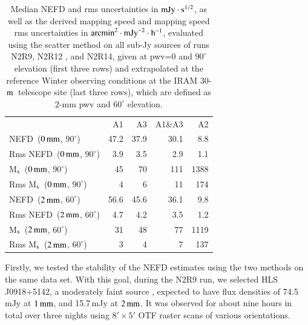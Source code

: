 \documentclass[traditionalabstract]{aa}
\newcommand{\hls}{HLS\,J0918+5142}
\newcommand{\trentemetre}{30-$\rm{m}$}
\begin{document}
{\begin{table}[!thbp]
  \begin{center}
    \caption[NEFD estimates on all sub-Jy sources]{Median NEFD and rms
      uncertainties in $\rm{mJy}\cdot s^{1/2}$, as well as the derived mapping
      speed and mapping speed rms uncertainties in
    $\rm{arcmin}^2\cdot \rm{mJy}^{-2}\cdot\rm{h}^{-1}$, evaluated
using the scatter method on all sub-Jy sources of runs N2R9, N2R12
,      and N2R14, given at pwv=0 and $90^{\circ}$ elevation (first three rows) and extrapolated at the
      reference Winter observing conditions at the IRAM
      \trentemetre\ telescope site (last three rows), which are defined
      as $2$-mm pwv and $60^{\circ}$ elevation.}
    \label{tab:nefd_astro}
    \begin{tabular}{lrrrr}
      \hline\hline
      \noalign{\smallskip}
                    & A1      &   A3    &   A1\&A3 &    A2 \\
      \noalign{\smallskip}
      \hline
      \noalign{\smallskip}
      NEFD\, \small{($0\,\rm{mm}$, $90^{\circ}$)}             & 47.2    & 37.9    &    30.1  &    8.8   \\
      Rms NEFD\, \small{($0\,\rm{mm}$, $90^{\circ}$)}         &  3.9    &  3.5    &     2.9  &    1.1   \\
      M$_{\rm{s}}$\, \small{($0\,\rm{mm}$, $90^{\circ}$)}      & 45      &  70     &    111   &   1388   \\
      Rms M$_{\rm{s}}$\, \small{($0\,\rm{mm}$, $90^{\circ}$)}  &  4      &   6     &     11   &    174   \\
      \hline
      \noalign{\smallskip}
      NEFD\, \small{($2\,\rm{mm}$, $60^{\circ}$)}             & 56.6    & 45.6    &    36.1  &    9.8   \\
      Rms NEFD\, \small{($2\,\rm{mm}$, $60^{\circ}$)}         &  4.7    & 4.2     &     3.5  &    1.2   \\
      M$_{\rm{s}}$\, \small{($2\,\rm{mm}$, $60^{\circ}$)}      &  31    & 48       &    77   &   1119   \\
      Rms M$_{\rm{s}}$\, \small{($2\,\rm{mm}$, $60^{\circ}$)}  &   3    &  4       &     7     &  137   \\
      \hline
    \end{tabular}
\end{center}
\end{table}

Firstly, we tested the stability of the NEFD estimates using the two methods on the
same data set. With this goal, during the N2R9 run, we selected \hls, a
moderately faint source \citep{2012A&A...538L...4C}, expected to have
flux densities of 74.5\,mJy at $1\,\rm{mm}$,
and 15.7\,mJy at $2\, \rm{mm}$. %
It was observed for about nine hours in total over three nights using
$8' \times 5'$ OTF raster scans of various orientations.\\


}
\end{document}

